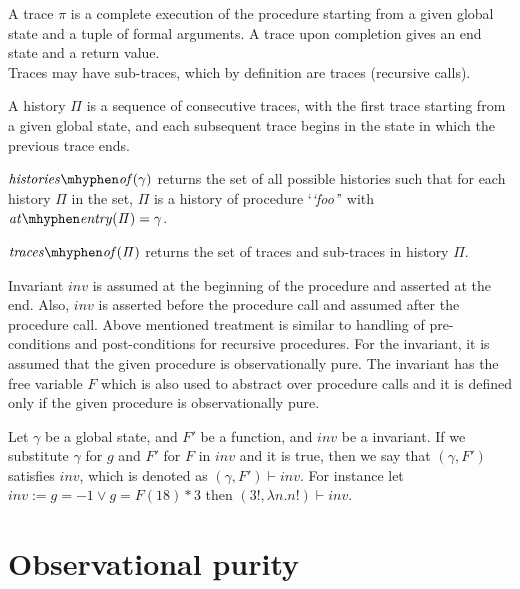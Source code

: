 \documentclass{llncs}
\newcommand{\foo}{\textit{`foo'}}
\newcommand{\trace}{\pi}
\newcommand{\inv}{\mathit{inv}}
\newcommand{\history}{\Pi}
\newcommand{\F}{\mathit{F}}
\newcommand{\gstate}{\gamma}
\newcommand{\satisfies}{\vdash}
\newcommand{\atEntry}[1]{\mathit{at \mhyphen entry(#1)}}
\newcommand{\historyOf}[1]{\mathit{histories \mhyphen of(#1)}}
\newcommand{\tracesOf}[1]{\mathit{traces \mhyphen of(#1)}}
\begin{document}
\begin{definition}[trace]
  A trace $\trace$ is a complete execution of the procedure starting
  from a given global state and a tuple of formal arguments. A trace
  upon completion gives an end state and a return value.\\ Traces may
  have sub-traces, which by definition are traces (recursive calls).
\end{definition}

\begin{definition}[history]
  A history $\history$ is a sequence of consecutive traces, with the
  first trace starting from a given global state, and each subsequent
  trace begins in the state in which the previous trace ends.
\end{definition}

\begin{definition} 
  $\historyOf{\gstate}$ returns the set of all possible histories such
  that for each history $\history$ in the set, $\history$ is a history
  of procedure `\foo' with $\atEntry{\history} = \gstate$.
\end{definition}

\begin{definition} $\tracesOf{\history}$ returns the set of traces and
  sub-traces in history $\history$.
\end{definition}

Invariant $\inv$ is assumed at the beginning of the procedure and
asserted at the end. Also, $\inv$ is asserted before the procedure
call and assumed after the procedure call. Above mentioned treatment
is similar to handling of pre-conditions and post-conditions for
recursive procedures. For the invariant, it is assumed that the given
procedure is observationally pure. The invariant has the free variable
$\F$ which is also used to abstract over procedure calls and it is
defined only if the given procedure is observationally pure.

Let $\gstate$ be a global state, and $\F'$ be a function, and $\inv$
be a invariant. If we substitute $\gstate$ for $g$ and $\F'$ for $\F$
in $\inv$ and it is true, then we say that $(\gstate, \F')$ satisfies
$\inv$, which is denoted as $(\gstate, \F') \satisfies \inv$. For
instance let $\inv := g = -1 \vee g = \F(18) * 3$ then $(3!, \lambda
n. n!) \satisfies \inv$.

\section{Observational purity}\label{sec:op}
\end{document}
